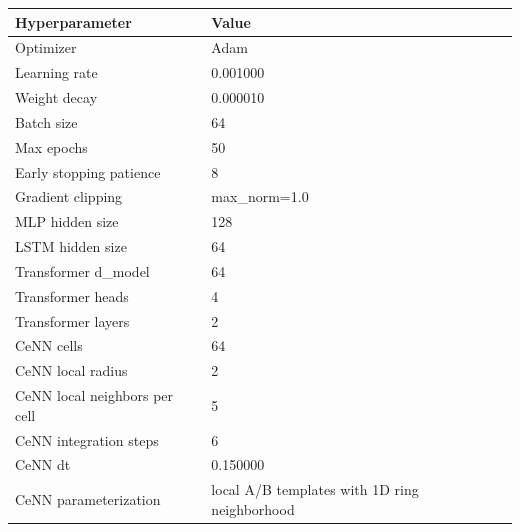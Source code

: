 \begin{tabular}{ll}
\toprule
Hyperparameter & Value \\
\midrule
Optimizer & Adam \\
Learning rate & 0.001000 \\
Weight decay & 0.000010 \\
Batch size & 64 \\
Max epochs & 50 \\
Early stopping patience & 8 \\
Gradient clipping & max_norm=1.0 \\
MLP hidden size & 128 \\
LSTM hidden size & 64 \\
Transformer d_model & 64 \\
Transformer heads & 4 \\
Transformer layers & 2 \\
CeNN cells & 64 \\
CeNN local radius & 2 \\
CeNN local neighbors per cell & 5 \\
CeNN integration steps & 6 \\
CeNN dt & 0.150000 \\
CeNN parameterization & local A/B templates with 1D ring neighborhood \\
\bottomrule
\end{tabular}
